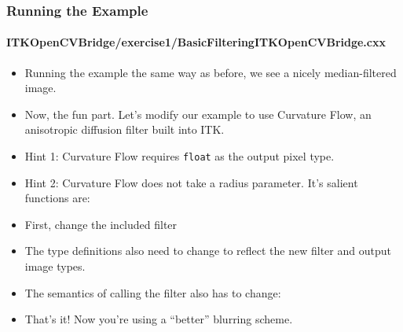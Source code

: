 \begin{frame}
\frametitle{Running the Example}
\framesubtitle{ITKOpenCVBridge/exercise1/BasicFilteringITKOpenCVBridge.cxx}
\begin{itemize}
\item Running the example the same way as before, we see a nicely
median-filtered image.
\pause
\item Now, the fun part. Let's modify our example to use Curvature Flow, an
anisotropic diffusion filter built into ITK.
\end{itemize}
\end{frame}

\begin{frame}
\begin{itemize}
\frametitle{Exercise 1}
\framesubtitle{ITKOpenCVBridge/exercise1/BasicFilteringITKOpenCVBridge.cxx}
\item Hint 1: Curvature Flow requires {\tt float} as the output pixel
  type.
\pause
\item Hint 2: Curvature Flow does not take a radius parameter. It's
  salient functions are:
\end{itemize}
\end{frame}

\begin{frame}
\begin{itemize}
\frametitle{Exercise 1: Answer}
\framesubtitle{ITKOpenCVBridge/exercise1/BasicFilteringITKOpenCVBridgeAnswer.cxx}
\item First, change the included filter
\pause
\item The type definitions also need to change to reflect the new
  filter and output image types.
\end{itemize}
\end{frame}

\begin{frame}
\begin{itemize}
\frametitle{Exercise 1: Answer}
\framesubtitle{ITKOpenCVBridge/exercise1/BasicFilteringITKOpenCVBridgeAnswer.cxx}
\item The semantics of calling the filter also has to change:
\pause
\item That's it! Now you're using a ``better'' blurring scheme.
\end{itemize}
\end{frame}

